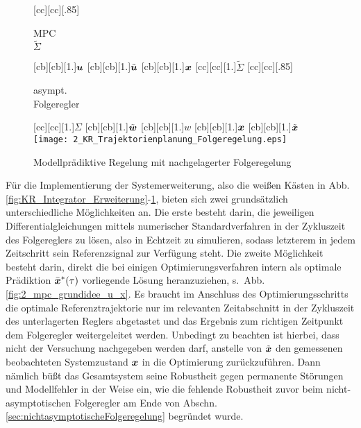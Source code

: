 \begin{figure}[h]
\centering
\newcommand{\smallsize}{.85}
			[cc][cc][\smallsize]{\parbox[c]{7cm}{\begin{center}MPC\\ $\tilde\Sigma$ \end{center}}}
		[cb][cb][1.]{$\boldsymbol{u}$}
		[cb][cb][1.]{$\tilde{\boldsymbol{u}}$}
		[cb][cb][1.]{$\boldsymbol{x}$}
		[cc][cc][1.]{$\tilde \Sigma$}
		[cc][cc][\smallsize]{\parbox[c]{7cm}{\begin{center}asympt.\ \\ Folgeregler \end{center}}}
		[cc][cc][1.]{$\Sigma$}
		[cb][cb][1.]{$\tilde {\boldsymbol{w}}$}
		[cb][cb][1.]{$w$}
		[cb][cb][1.]{$\boldsymbol{x}$}
		[cb][cb][1.]{$\tilde{\boldsymbol{x}}$}
	\texttt{[image: 2\_KR\_Trajektorienplanung\_Folgeregelung.eps]}
	\caption{Modellprädiktive Regelung mit nachgelagerter Folgeregelung}
	\label{fig:KR_Trajektorienplanung_Folgeregelung}
\end{figure}

Für die Implementierung der Systemerweiterung, also die weißen Kästen in Abb.\,\ref{fig:KR_Integrator_Erweiterung}-\ref{fig:KR_Trajektorienplanung_Folgeregelung}, bieten sich zwei grundsätzlich unterschiedliche Möglichkeiten an. Die erste besteht darin, die jeweiligen Differentialgleichungen mittels numerischer Standardverfahren in der Zykluszeit des Folgereglers zu lösen, also in Echtzeit zu simulieren, sodass letzterem in jedem Zeitschritt sein Referenzsignal zur Verfügung steht.
Die zweite Möglichkeit besteht darin, direkt die bei einigen Optimierungsverfahren intern als optimale Prädiktion $\bar{\boldsymbol{x}}^\ast(\tau)$ vorliegende Lösung heranzuziehen, s.\ Abb.\,\ref{fig:2_mpc_grundidee_u_x}. Es braucht im Anschluss des Optimierungsschritts die optimale Referenztrajektorie nur im relevanten Zeitabschnitt in der Zykluszeit des unterlagerten Reglers abgetastet und das Ergebnis zum richtigen Zeitpunkt dem Folgeregler weitergeleitet werden. Unbedingt zu beachten ist hierbei, dass nicht der Versuchung nachgegeben werden darf, anstelle von  $\tilde{\boldsymbol{x}}$ den gemessenen \bzw beobachteten Systemzustand $\boldsymbol{x}$ in die Optimierung zurückzuführen. Dann nämlich büßt das Gesamtsystem seine Robustheit gegen permanente Störungen und Modellfehler in der Weise ein, wie die fehlende Robustheit zuvor beim nicht-asymptotischen Folgeregler am Ende von Abschn.\,\ref{sec:nichtasymptotischeFolgeregelung} begründet wurde.

